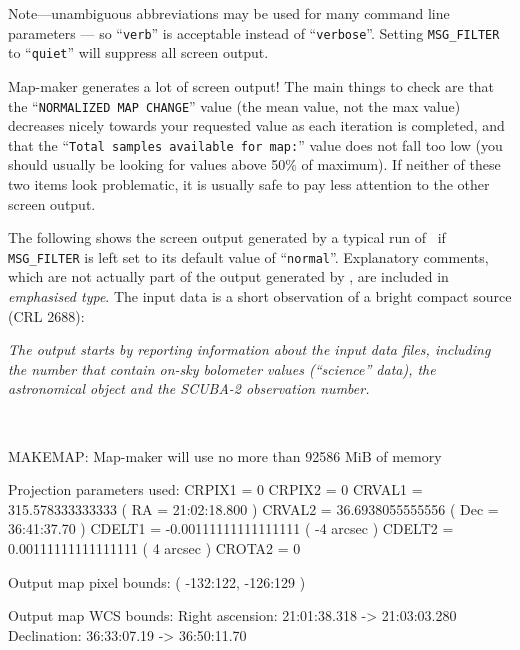 
Note---unambiguous abbreviations may be used for many command line
parameters --- so ``\texttt{verb}'' is acceptable instead of
``\texttt{verbose}''. Setting \texttt{MSG\_FILTER} to ``\texttt{quiet}''
will suppress all screen output.

\begin{tip}
  Map-maker generates a lot of screen output! The main things to check
  are that the ``\texttt{NORMALIZED MAP CHANGE}'' value (the mean value,
  not the max value) decreases nicely towards your requested
   value as each iteration is completed, and that
  the ``\texttt{Total samples available for map:}'' value does not fall
  too low (you should usually be looking for values above 50\% of
  maximum). If neither of these two items look problematic, it is usually
  safe to pay less attention to the other screen output.
\end{tip}

The following shows the screen output generated by a typical run of \makemap\
if \texttt{MSG\_FILTER} is left set to its default value of
``\texttt{normal}''. Explanatory comments, which are not actually
part of the output generated by \makemap, are included in \emph{emphasised
type}. The input data is a short observation of a bright compact source
(CRL 2688):


\emph{The output starts by reporting information about the input data files,
including the number that contain on-sky bolometer values (``science''
data), the astronomical object and the SCUBA-2 observation number.}

~
\begin{terminalv}

MAKEMAP: Map-maker will use no more than 92586 MiB of memory

   Projection parameters used:
      CRPIX1 = 0
      CRPIX2 = 0
      CRVAL1 = 315.578333333333 ( RA = 21:02:18.800 )
      CRVAL2 = 36.6938055555556 ( Dec = 36:41:37.70 )
      CDELT1 = -0.00111111111111111 ( -4 arcsec )
      CDELT2 = 0.00111111111111111 ( 4 arcsec )
      CROTA2 = 0

   Output map pixel bounds: ( -132:122, -126:129 )

   Output map WCS bounds:
        Right ascension: 21:01:38.318 -> 21:03:03.280
        Declination: 36:33:07.19 -> 36:50:11.70
\end{terminalv}

